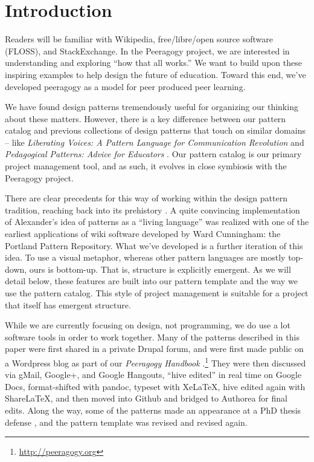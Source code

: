 \section{Introduction}\label{sec:Introduction}

Readers will be familiar with Wikipedia, free/libre/open source software (FLOSS), and StackExchange.  In the Peeragogy project, we are interested in understanding and exploring ``how that all works.''    We want to build upon these inspiring examples to help design the future of education.  Toward this end, we've developed peeragogy as a model for peer produced peer learning.

We have found design patterns tremendously useful for organizing our thinking about these matters.  However, there is a key difference between our pattern catalog and previous collections of design patterns that touch on similar domains -- like \emph{Liberating Voices: A Pattern Language for Communication Revolution} \cite{schuler2008liberating} and \emph{Pedagogical Patterns: Advice for Educators} \cite{bergin2012pedagogical}.  Our pattern catalog is our primary project management tool, and as such, it evolves in close symbiosis with the Peeragogy project.

There are clear precedents for this way of working within the design pattern tradition, reaching back into its prehistory \cite{alexander1964notes}.  A quite convincing implementation of Alexander’s idea of patterns as a ``living language'' \cite[p.~xvii]{alexander1977pattern} was realized with one of the earliest applications of wiki software developed by Ward Cunningham: the Portland Pattern Repository. What we've developed is a further iteration of this idea. To use a visual metaphor, whereas other pattern languages are mostly top-down, ours is bottom-up.  That is, structure is explicitly emergent.  As we will detail below, these features are built into our pattern template and the way we use the pattern catalog.  This style of project management is suitable for a project that itself has emergent structure.

While we are currently focusing on design, not programming, we do use a lot software tools in order to work together.  Many of the patterns described in this paper were first shared in a private Drupal forum, and were first made public on a Wordpress blog as part of our \emph{Peeragogy Handbook} \cite{peeragogy-handbook}.\footnote{\url{http://peeragogy.org}}  They were then discussed via gMail, Google+, and Google Hangouts, ``hive edited'' in real time on Google Docs, format-shifted with pandoc, typeset with XeLaTeX, hive edited again with ShareLaTeX, and then moved into Github and bridged to Authorea for final edits.  Along the way, some of the patterns made an appearance at a PhD thesis defense \cite{corneli-thesis}, and the pattern template was revised and revised again.  

